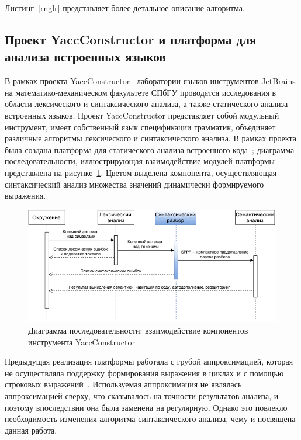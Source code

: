 Листинг~\ref{rnglr} представляет более детальное описание алгоритма.

\subsection{Проект YaccConstructor и платформа для анализа встроенных языков}
В рамках проекта YaccConstructor~\cite{YC} лаборатории языков инструментов JetBrains на математико-механическом факультете СПбГУ проводятся исследования в области лексического и синтаксического анализа, 
а также статического анализа встроенных языков. Проект YaccConstructor представляет собой модульный инструмент, имеет собственный язык спецификации грамматик, объединяет различные алгоритмы лексического и 
синтаксического анализа. В рамках проекта была создана платформа для статического анализа встроенного кода~\cite{SECR14}; диаграмма последовательности, иллюстрирующая взаимодействие модулей платформы 
представлена на рисунке~\ref{seq}. Цветом выделена компонента, осуществляющая синтаксический анализ множества значений динамически формируемого выражения. 
\begin{figure}[!h]
 \centering
 \includegraphics[width=15cm]{pics/Seq_rus.png}
 \caption{Диаграмма последовательности: взаимодействие компонентов
инструмента YaccConstructor}
 \label{seq}
\end{figure}

Предыдущая реализация платформы работала с грубой аппроксимацией, которая не осуществляла поддержку формирования выражения в циклах и с помощью строковых выражений~\cite{SECR13}. Используемая аппроксимация не являлась аппроксимацией сверху, что сказывалось на точности результатов анализа, и поэтому впоследствии она была заменена на регулярную. Однако это повлекло необходимость изменения алгоритма синтаксического анализа, чему и посвящена данная работа. 